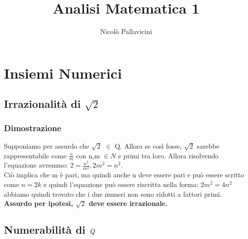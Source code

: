 \documentclass[11pt, a4paper]{book}
\author{Nicolò Pallavicini}
\title{Analisi Matematica 1}
\begin{document}
\maketitle

\chapter{Insiemi Numerici}
\section{Irrazionalità di $\sqrt{2}$}
\subsection*{Dimostrazione}
Supponiamo per assurdo che $\sqrt{2}$ $\in$ Q. Allora se così fosse, $\sqrt{2}$ sarebbe rappresentabile come $\frac{n}{m}$ con n,m $\in{N}$ e primi tra loro. Allora risolvendo l'equazione avremmo: \begin{math}
2=\frac{n^2}{m^2},2m^2=n^2
\end{math}.
\\
Ciò implica che m è pari, ma quindi anche n deve essere pari e può essere scritto come \begin{math} n=2k \end{math}
e quindi l'equazione può essere riscritta nella forma: \begin{math} 2m^2=4n^2 \end{math} abbiamo quindi trovato che i due numeri non sono ridotti a fattori primi. \textbf{Assurdo per ipotesi, $\sqrt{2}$ deve essere irrazionale.}

\section{Numerabilità di $\emph{Q}$}
\end{document}
